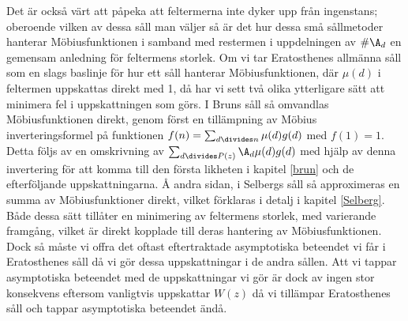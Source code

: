 Det är också värt att påpeka att feltermerna inte dyker upp från ingenstans; oberoende vilken av dessa såll man väljer så är det hur dessa små sållmetoder hanterar Möbiusfunktionen i samband med restermen i uppdelningen av \(\#\A_d\) en gemensam anledning för feltermens storlek.
Om vi tar Eratosthenes allmänna såll som en slags baslinje för hur ett såll hanterar Möbiusfunktionen, där \(\mu(d)\) i feltermen uppskattas direkt med 1, då har vi sett två olika ytterligare sätt att minimera fel i uppskattningen som görs. 
I Bruns såll så omvandlas Möbiusfunktionen direkt, genom först en tillämpning av Möbius inverteringsformel på funktionen \(f(n) = \sum_{d\divides n}\mu(d)g(d)\) med \(f(1) = 1\). 
Detta följs av en omskrivning av \(\sum_{d\divides P(z)}\A_d \mu(d) g(d)\) med hjälp av denna invertering för att komma till den första likheten i kapitel \ref{brun} och de efterföljande uppskattningarna. 
Å andra sidan, i Selbergs såll så approximeras en summa av Möbiusfunktioner direkt, vilket förklaras i detalj i kapitel \ref{Selberg}.
Både dessa sätt tillåter en minimering av feltermens storlek, med varierande framgång, vilket är direkt kopplade till deras hantering av Möbiusfunktionen.
Dock så måste vi offra det oftast eftertraktade asymptotiska beteendet vi får i Eratosthenes såll då vi gör dessa uppskattningar i de andra sållen.
Att vi tappar asymptotiska beteendet med de uppskattningar vi gör är dock av ingen stor konsekvens eftersom vanligtvis uppskattar \(W(z)\) då vi tillämpar Eratosthenes såll och tappar asymptotiska beteendet ändå.


